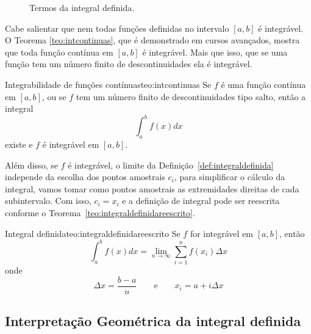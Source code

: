\begin{figure}
   \centering
   \caption{Termos da integral definida.}
   \label{fig:retangulos}
\end{figure}

Cabe salientar que nem todas funções definidas no intervalo $[a, b]$ é
integrável. O Teorema \ref{teo:intcontinuas}, que é demonstrado em cursos
avançados, mostra que toda função contínua em $[a, b]$ é integrável. Mais que
isso, que se uma função tem um número finito de descontinuidades ela é
integrável.

\begin{teorema}{Integrabilidade de funções contínuas}{teo:intcontinuas}
  Se $f$ é uma função contínua em $[a, b]$, ou se $f$ tem um número finito de
  descontinuidades tipo salto, então a integral
  \[
    \int_a^b f(x) dx
  \]
  existe e $f$ é integrável em $[a, b]$.
\end{teorema}

Além disso, se $f$ é integrável, o limite da
Definição~\ref{def:integraldefinida}
independe da escolha dos pontos amostrais $c_i$,
para simplificar o cálculo da integral, vamos tomar como pontos amostrais as
extremidades direitas de cada subintervalo. Com isso, $c_i=x_i$ e a definição
de integral pode ser reescrita conforme o
Teorema~\ref{teo:integraldefinidareescrito}.

\begin{teorema}{Integral definida}{teo:integraldefinidareescrito}
  Se $f$ for integrável em $[a, b]$, então
  \[
    \int_a^b f(x) dx
    =  \lim_{n \to \infty} \sum_{i=1}^n f(x_i) \Delta x
  \]
  onde
  \[
    \Delta x = \frac{b-a}{n} \qquad\text{e}\qquad
    x_i = a + i\Delta x
  \]
\end{teorema}

\subsection{Interpretação Geométrica da integral definida}

